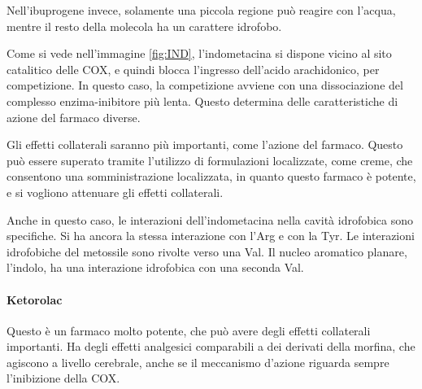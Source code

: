 Nell'ibuprogene invece, solamente una piccola regione può reagire con
l'acqua, mentre il resto della molecola ha un carattere idrofobo.


Come si vede nell'immagine \ref{fig:IND}, l'indometacina si dispone vicino al sito catalitico delle COX, e quindi
blocca l'ingresso dell'acido arachidonico, per competizione. In questo
caso, la competizione avviene con una dissociazione del complesso
enzima-inibitore più lenta. Questo determina delle caratteristiche di
azione del farmaco diverse.

Gli effetti collaterali saranno più importanti, come l'azione del
farmaco. Questo può essere superato tramite l'utilizzo di formulazioni
localizzate, come creme, che consentono una somministrazione
localizzata, in quanto questo farmaco è potente, e si vogliono attenuare
gli effetti collaterali.

Anche in questo caso, le interazioni dell'indometacina nella cavità
idrofobica sono specifiche. Si ha ancora la stessa interazione con l'Arg
e con la Tyr. Le interazioni idrofobiche del metossile sono rivolte
verso una Val. Il nucleo aromatico planare, l'indolo, ha una interazione
idrofobica con una seconda Val.


\paragraph{Ketorolac}

Questo è un farmaco molto potente, che può avere degli effetti
collaterali importanti. Ha degli effetti analgesici comparabili a dei
derivati della morfina, che agiscono a livello cerebrale, anche se il
meccanismo d'azione riguarda sempre l'inibizione della COX.

